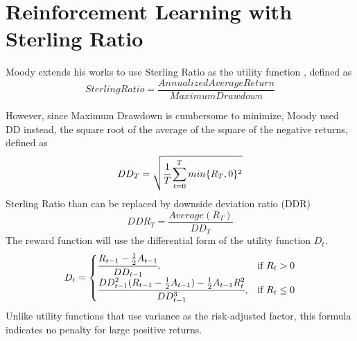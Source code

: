 \section{Reinforcement Learning with Sterling Ratio}
Moody extends his works to use  Sterling Ratio as the utility function \cite{moody1998performance}, defined as 
\[
Sterling Ratio=\frac{Annualized Average Return}{Maximum Drawdown}
\]

However, since Maximum Drawdown is cumbersome to minimize, Moody used DD instead, the square root of the average of the
square of the negative returns, defined as
\[
DD_T = \sqrt{\cfrac{1}{T}\sum_{t=0}^{T}{min\{R_T,0\}^2}}
\]
Sterling Ratio than can be replaced by downside deviation ratio (DDR)
\[
DDR_T = \frac{Average(R_T)}{DD_T}
\]
The reward function will use the differential form of the utility function \(D_t\).
\[
D_t = 
\begin{cases}
    \cfrac{R_{t-1} -\frac{1}{2}A_{t-1}}{DD_{t-1}},&\text{if  }R_t > 0\\
    \cfrac{DD_{t-1}^2 (R_{t-1}-\frac{1}{2}A_{t-1})  -\frac{1}{2}A_{t-1} R_t^2}{DD_{t-1}^3},&\text{if  }R_t \leq 0
\end{cases}
\]
Unlike utility functions that use variance as the risk-adjusted factor, this formula indicates no penalty for large positive returns. 